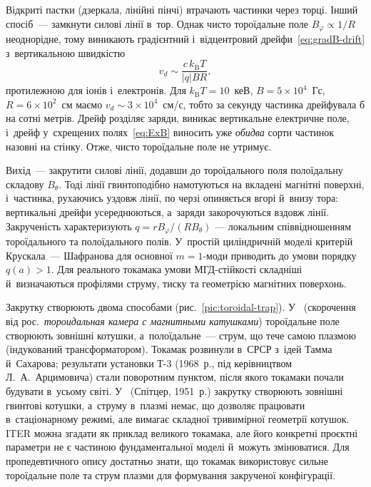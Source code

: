 Відкриті пастки (дзеркала, лінійні пінчі) втрачають частинки через торці. Інший спосіб~---
замкнути силові лінії в~тор. Однак чисто тороїдальне поле $B_\varphi\propto1/R$
неоднорідне, тому виникають градієнтний і~відцентровий дрейфи~\eqref{eq:gradB-drift}
з~вертикальною швидкістю
\begin{equation*}
	v_d\sim\frac{c\,k_{\mathrm B}T}{|q|BR},
\end{equation*}
протилежною для іонів і~електронів. Для $k_{\mathrm B}T=10$~кеВ, $B=5\times10^4$~Гс,
$R=6\times10^2$~см маємо $v_d\sim3\times10^4$~см/с, тобто за секунду частинка дрейфувала б
на сотні метрів. Дрейф розділяє заряди, виникає вертикальне електричне поле, і~дрейф
у~схрещених полях~\eqref{eq:ExB} виносить уже \emph{обидва} сорти частинок назовні на
стінку. Отже, чисто тороїдальне поле не утримує.

Вихід~--- закрутити силові лінії, додавши до тороїдального поля полоїдальну складову
$B_\theta$. Тоді лінії гвинтоподібно намотуються на вкладені магнітні поверхні,
і~частинка, рухаючись уздовж лінії, по черзі опиняється вгорі й~внизу тора: вертикальні
дрейфи усереднюються, а~заряди закорочуються вздовж лінії. Закрученість характеризують
 $q=rB_\varphi/(RB_\theta)$ — локальним співвідношенням
тороїдального та полоїдального полів. У~простій циліндричній моделі критерій Крускала~---
Шафранова для основної $m=1$-моди приводить до умови порядку $q(a)>1$. Для реального
токамака умови МГД-стійкості складніші й~визначаються профілями струму, тиску та
геометрією магнітних поверхонь.

Закрутку створюють двома способами (рис.~\ref{pic:toroidal-trap}). У~
(скорочення від рос.~\emph{тороидальная камера с магнитными катушками}) тороїдальне поле
створюють зовнішні котушки, а~полоїдальне~--- струм, що тече самою плазмою (індукований
трансформатором). Токамак розвинули в~СРСР з~ідей Тамма й~Сахарова; результати установки
Т-3 (1968~р., під керівництвом Л.~А.~Арцимовича) стали поворотним пунктом, після якого
токамаки почали будувати в~усьому світі. У~ (Спітцер, 1951~р.) закрутку
створюють зовнішні гвинтові котушки, а~струму в~плазмі немає, що дозволяє працювати
в~стаціонарному режимі, але вимагає складної тривимірної геометрії котушок. ITER можна
згадати як приклад великого токамака, але його конкретні проєктні параметри не є частиною
фундаментальної моделі й~можуть змінюватися. Для пропедевтичного опису достатньо знати, що
токамак використовує сильне тороїдальне поле та струм плазми для формування закрученої
конфігурації.

